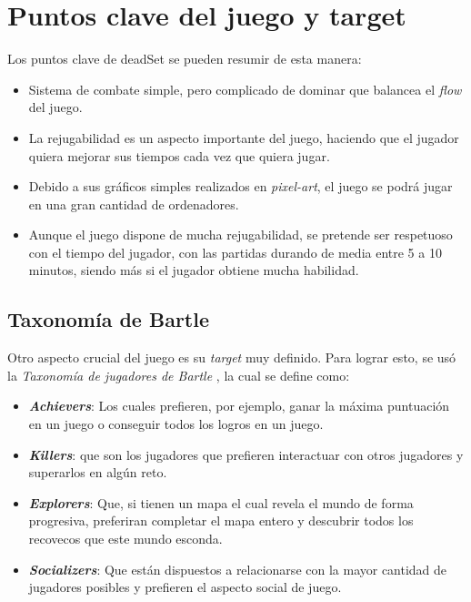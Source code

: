 \documentclass[12pt]{article}
\begin{document}
\section{Puntos clave del juego y target}
    Los puntos clave de \textunderscore deadSet se pueden resumir de esta manera: 
    \begin{itemize}
        \item Sistema de combate simple, pero complicado de dominar que balancea el \textit{flow} del juego.
        \item La rejugabilidad es un aspecto importante del juego, haciendo que el jugador quiera mejorar sus tiempos cada vez que quiera jugar. 
        \item Debido a sus gráficos simples realizados en \textit{pixel-art}, el juego se podrá jugar en una gran cantidad de ordenadores. 
        \item Aunque el juego dispone de mucha rejugabilidad, se pretende ser respetuoso con el tiempo del jugador, con las partidas durando de media entre 5 a 10 minutos, siendo más si el jugador obtiene mucha habilidad. 
    \end{itemize}
        
        \subsection{Taxonomía de Bartle}
            Otro aspecto crucial del juego es su \textit{target} muy definido. Para lograr esto, se usó la \textit{Taxonomía de jugadores de Bartle} \cite{bartle}, la cual se define como: 
                \begin{itemize}
                    \item \textit{\textbf{Achievers}}: Los cuales prefieren, por ejemplo,  ganar la máxima puntuación en un juego o conseguir todos los logros en un juego. 
                    \item \textit{\textbf{Killers}}: que son los jugadores que prefieren interactuar con otros jugadores y superarlos en algún reto.
                    \item \textit{\textbf{Explorers}}: Que, si tienen un mapa el cual revela el mundo de forma progresiva, preferiran completar el mapa entero y descubrir todos los recovecos que este mundo esconda.
                    \item \textit{\textbf{Socializers}}: Que están dispuestos a relacionarse con la mayor cantidad de jugadores posibles y prefieren el aspecto social de juego. 
                \end{itemize}
    
\end{document}
